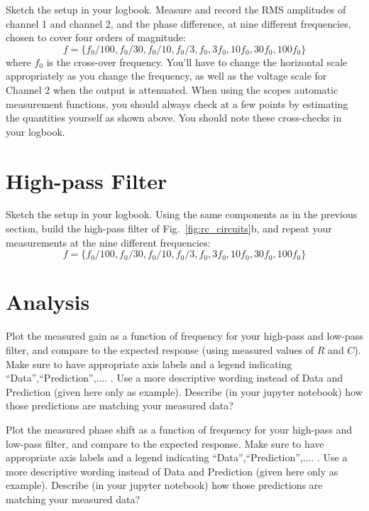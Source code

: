 \begin{measurement} 
Sketch the setup in your logbook. Measure and record the RMS amplitudes of channel 1 and channel 2, and the phase difference, at 
nine different frequencies, chosen to cover four orders of magnitude:
\begin{displaymath}
f=\{f_0/100, f_0/30, f_0/10, f_0/3,f_0, 3f_0, 10f_0, 30f_0, 100f_0\}
\end{displaymath}
where $f_0$ is the cross-over frequency.  You'll have to change the
horizontal scale appropriately as you change the frequency, as well as
the voltage scale for Channel 2 when the output is attenuated.  When
using the scopes automatic measurement functions, you should always
check at a few points by estimating the quantities yourself as shown
above.  You should note these cross-checks in your logbook. \end{measurement}

\section{High-pass Filter}

\begin{measurement} Sketch the setup in your logbook. Using the same components as in the previous section, build the
high-pass filter of Fig.~\ref{fig:rc_circuits}b, and repeat your
measurements at the nine different frequencies:
\begin{displaymath}
f=\{f_0/100, f_0/30, f_0/10, f_0/3,f_0, 3f_0, 10f_0, 30f_0, 100f_0\}
\end{displaymath}
\end{measurement}


\section{Analysis}

\begin{plot} Plot the measured gain as a function of frequency for your high-pass
and low-pass filter, and compare to the expected response (using measured values of $R$ and $C$). 
Make sure to have
appropriate axis labels and a legend indicating ``Data'',``Prediction'',.... .
Use a more descriptive wording instead of Data and Prediction (given here only as example). 
Describe (in your jupyter notebook) how those predictions are matching your measured data? \end{plot}

\begin{plot}  Plot the
measured phase shift as a function of frequency for your high-pass and
low-pass filter, and compare to the expected response. Make sure to have
appropriate axis labels and a legend indicating ``Data'',``Prediction'',.... .
Use a more descriptive wording instead of Data and Prediction (given here only as example). 
Describe (in your jupyter notebook) how those predictions are matching your measured data?
\end{plot}



